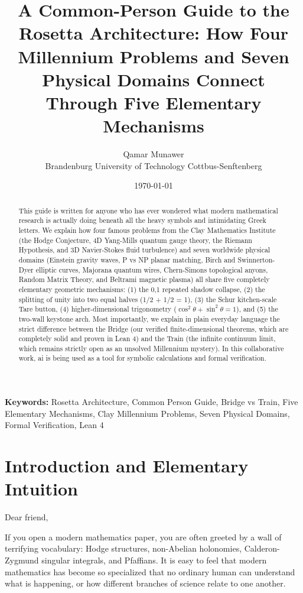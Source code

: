 \documentclass[11pt,a4paper]{article}
\title{\textbf{A Common-Person Guide to the Rosetta Architecture: How Four Millennium Problems and Seven Physical Domains Connect Through Five Elementary Mechanisms}}
\author{Qamar Munawer \\ Brandenburg University of Technology Cottbus-Senftenberg}
\date{\today}
\theoremstyle{definition}
\begin{document}
\maketitle

\begin{abstract}
This guide is written for anyone who has ever wondered what modern mathematical research is actually doing beneath all the heavy symbols and intimidating Greek letters. We explain how four famous problems from the Clay Mathematics Institute (the Hodge Conjecture, 4D Yang-Mills quantum gauge theory, the Riemann Hypothesis, and 3D Navier-Stokes fluid turbulence) and seven worldwide physical domains (Einstein gravity waves, P vs NP planar matching, Birch and Swinnerton-Dyer elliptic curves, Majorana quantum wires, Chern-Simons topological anyons, Random Matrix Theory, and Beltrami magnetic plasma) all share five completely elementary geometric mechanisms: (1) the {0,1} repeated shadow collapse, (2) the splitting of unity into two equal halves (1/2 + 1/2 = 1), (3) the Schur kitchen-scale Tare button, (4) higher-dimensional trigonometry ($\cos^2\theta + \sin^2\theta = 1$), and (5) the two-wall keystone arch. Most importantly, we explain in plain everyday language the strict difference between the Bridge (our verified finite-dimensional theorems, which are completely solid and proven in Lean 4) and the Train (the infinite continuum limit, which remains strictly open as an unsolved Millennium mystery). In this collaborative work, ai is being used as a tool for symbolic calculations and formal verification.
\end{abstract}

\vspace{1em}
\noindent\textbf{Keywords:} Rosetta Architecture, Common Person Guide, Bridge vs Train, Five Elementary Mechanisms, Clay Millennium Problems, Seven Physical Domains, Formal Verification, Lean 4

\section{Introduction and Elementary Intuition}

Dear friend,

If you open a modern mathematics paper, you are often greeted by a wall of terrifying vocabulary: Hodge structures, non-Abelian holonomies, Calderon-Zygmund singular integrals, and Pfaffians. It is easy to feel that modern mathematics has become so specialized that no ordinary human can understand what is happening, or how different branches of science relate to one another.
\end{document}
